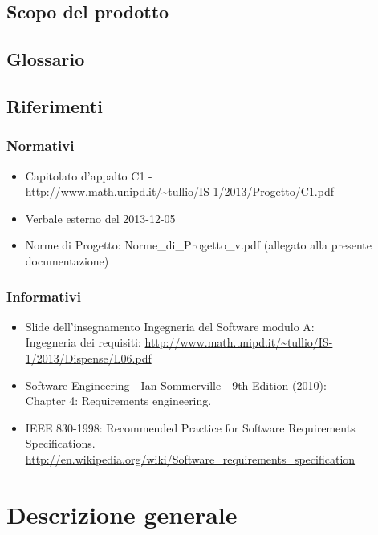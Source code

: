 \subsection{Scopo del prodotto} %
\label{1.2}
\Prodotto{}
\subsection{Glossario}%
\label{1.3}
\Glossario{}

\subsection{Riferimenti} %
\label{1.4}
\subsubsection{Normativi} %
\label{1.4.1}

\begin{itemize}
\item Capitolato d'appalto C1 - \Progetto{} \\
\url{http://www.math.unipd.it/~tullio/IS-1/2013/Progetto/C1.pdf}
\item Verbale esterno del 2013-12-05
\item Norme di Progetto: Norme\_{}di\_{}Progetto\_{}v\versioneNormeDiProgetto{}.pdf  (allegato alla presente documentazione)\\
\end{itemize}

\subsubsection{Informativi} %
\label{1.4.2}
\begin{itemize}
\item Slide dell'insegnamento Ingegneria del Software modulo A:\\
Ingegneria dei requisiti: \url{http://www.math.unipd.it/~tullio/IS-1/2013/Dispense/L06.pdf}
\item Software Engineering - Ian Sommerville - 9th Edition (2010):\\
Chapter 4: Requirements engineering.
\item IEEE 830-1998: Recommended Practice for Software Requirements Specifications.\\
\url{http://en.wikipedia.org/wiki/Software_requirements_specification}
\end{itemize}

\newpage
\section{Descrizione generale}%
\label{2.0}
